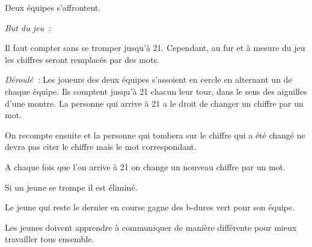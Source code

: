 \documentclass{grand-jeu}
\begin{document}
\begin{regles}
Deux équipes s’affrontent.

\vspace{0.2cm}
\emph{But du jeu :}

Il faut compter sans se tromper jusqu'à 21. Cependant, au fur et à mesure du jeu les chiffres seront remplacés par des mots. 

\vspace{0.2cm}
\emph{Déroulé :}
Les joueurs des deux équipes s'assoient en cercle en alternant un de chaque équipe. Ils comptent jusqu'à 21 chacun leur tour, dans le sens des aiguilles d’une montre. La personne qui arrive à 21 a le droit de changer un chiffre par un mot. 

On recompte ensuite et la personne qui tombera sur le chiffre qui a été changé ne devra pas citer le chiffre mais le mot correspondant. 

A chaque fois que l'on arrive à 21 on change un nouveau chiffre par un mot. 

Si un jeune se trompe il est éliminé.

Le jeune qui reste le dernier en course gagne des b-dures vert pour son équipe.
\end{regles}

\begin{imaginaire}
Les jeunes doivent apprendre à communiquer de manière différente pour mieux travailler tous ensemble.
\end{imaginaire}

\begin{moments-stop}
\end{moments-stop}
\end{document}
